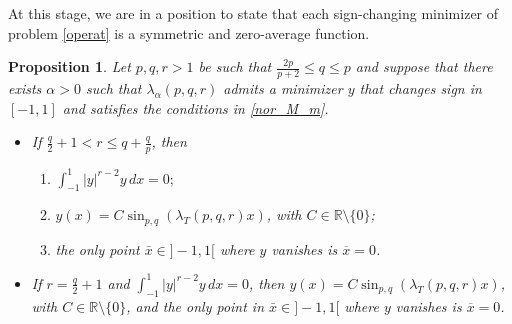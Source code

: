 \documentclass{amsart}
\newtheorem{prop}[thm]{Proposition}
\theoremstyle{definition}
\theoremstyle{remark}
\newcommand{\R}{\mathbb{R}}
\begin{document}
At this stage, we are in a position to state that each sign-changing minimizer of problem \eqref{operat} is a symmetric and zero-average function. 

\begin{prop}\label{cambiosegno} 
Let $p,q,r >1$ be such that $\frac{2p}{p+2}\le q\le p$ and suppose that there exists $\alpha>0$ such that $\lambda_\alpha(p,q,r)$ admits a minimizer $y$ that changes sign in $[-1,1]$ and satisfies the conditions in  \eqref{nor_M_m}.
\begin{itemize}
\item[{\it (i)}] If $\frac q2 +1< r \le q+\frac qp$, then
\begin{enumerate}
\item[{\it (a)}] %
$\int_{-1}^{1}|y|^{r-2}y\,dx=0;$%
\item[{\it (b)}] %
{$y(x)=C\sin_{p,q} (\lambda_T(p,q,r) x)$, with $C\in \R\setminus\{0\}$};
\item[{\it (c)}] the only point $\bar x\in ]-1,1[$ where $y$ vanishes is $\overline x=0$. 
\end{enumerate}
\item[{\it (ii)}] If $r=\frac q2 +1$ and $\int_{-1}^{1}|y|^{r-2}y\,dx=0$, then {$y(x)=C\sin_{p,q} (\lambda_T(p,q,r) x)$, with $C\in \R\setminus\{0\}$},
and the only point in $\bar x\in ]-1,1[$ where $y$ vanishes is $\overline x=0$. 
\end{itemize}
\end{prop}
\end{document}
